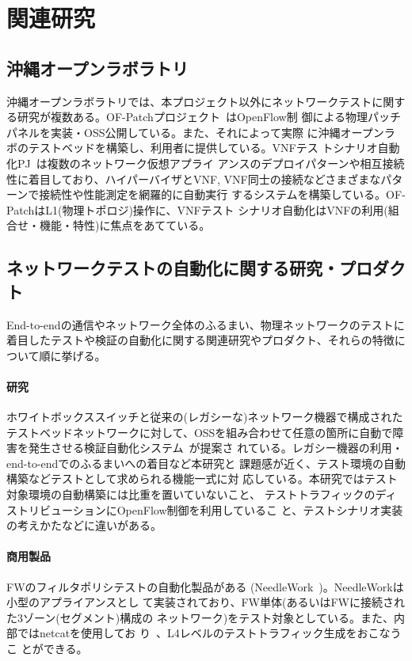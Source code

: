  \section{関連研究}
 \label{sec:related-research}

  \subsection{沖縄オープンラボラトリ}

沖縄オープンラボラトリでは、本プロジェクト以外にネットワークテストに関す
る研究が複数ある。OF-Patchプロジェクト~\cite{ool-testbedpj}はOpenFlow制
御による物理パッチパネルを実装・OSS公開している。また、それによって実際
に沖縄オープンラボのテストベッドを構築し、利用者に提供している。VNFテス
トシナリオ自動化PJ~\cite{ool-vnftestpj}は複数のネットワーク仮想アプライ
アンスのデプロイパターンや相互接続性に着目しており、ハイパーバイザとVNF,
VNF同士の接続などさまざまなパターンで接続性や性能測定を網羅的に自動実行
するシステムを構築している。OF-PatchはL1(物理トポロジ)操作に、VNFテスト
シナリオ自動化はVNFの利用(組合せ・機能・特性)に焦点をあてている。

  \subsection{ネットワークテストの自動化に関する研究・プロダクト}
End-to-endの通信やネットワーク全体のふるまい、物理ネットワークのテストに
着目したテストや検証の自動化に関する関連研究やプロダクト、それらの特徴に
ついて順に挙げる。

    \paragraph{研究}
ホワイトボックススイッチと従来の(レガシーな)ネットワーク機器で構成された
テストベッドネットワークに対して、OSSを組み合わせて任意の箇所に自動で障
害を発生させる検証自動化システム~\cite{wbsw-oss-test-automation}が提案さ
れている。レガシー機器の利用・end-to-endでのふるまいへの着目など本研究と
課題感が近く、テスト環境の自動構築などテストとして求められる機能一式に対
応している。本研究ではテスト対象環境の自動構築には比重を置いていないこと、
テストトラフィックのディストリビューションにOpenFlow制御を利用しているこ
と、テストシナリオ実装の考えかたなどに違いがある。

    \paragraph{商用製品}
FWのフィルタポリシテストの自動化製品がある
(NeedleWork~\cite{needlework-web})。NeedleWorkは小型のアプライアンスとし
て実装されており、FW単体(あるいはFWに接続された3ゾーン(セグメント)構成の
ネットワーク)をテスト対象としている。また、内部ではnetcatを使用してお
り~\cite{needlework-slide}、L4レベルのテストトラフィック生成をおこなうこ
とができる。

